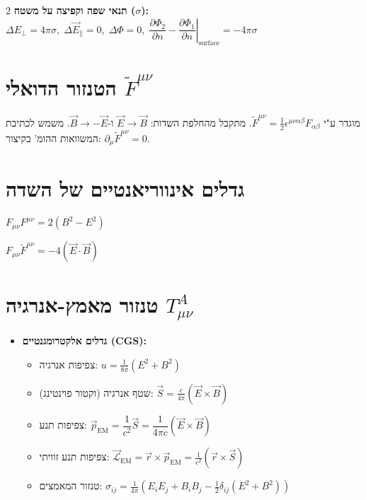\documentclass[10pt,a4paper]{article}
\begin{document}
\begin{multicols*}{2}
\textbf{תנאי שפה וקפיצה על משטח ($\sigma$):} 
\\
$\Delta E_\perp = 4\pi\sigma, \; \Delta \vec{E}_\parallel = 0, \; \Delta\Phi = 0, \; \left.\dfrac{\partial\Phi_2}{\partial n} - \dfrac{\partial\Phi_1}{\partial n}\right|_{\text{surface}} = -4\pi\sigma$

\section{הטנזור הדואלי $\tilde{F}^{\mu\nu}$}
מוגדר ע"י $\tilde{F}^{\mu\nu} = \frac{1}{2}\epsilon^{\mu\nu\alpha\beta}F_{\alpha\beta}$. מתקבל מהחלפת השדות: $\vec{E} \to \vec{B}$ ו-$\vec{B} \to -\vec{E}$.
משמש לכתיבת המשוואות ההומ' בקיצור: $\partial_\mu \tilde{F}^{\mu\nu} = 0$.

\section{גדלים אינווריאנטיים של השדה}
\begin{itemize*}[label=\textbullet, itemjoin={\quad}]
    \item $F_{\mu\nu}F^{\mu\nu} = 2(B^2 - E^2)$
    \item $F_{\mu\nu}\tilde{F}^{\mu\nu} = -4(\vec{E}\cdot\vec{B})$
\end{itemize*}

\section{טנזור מאמץ-אנרגיה $T_{\mu\nu}^{A}$}
\begin{itemize}
    \item \textbf{גדלים אלקטרומגנטיים \textenglish{(CGS)}:}
    \begin{itemize}
        \item צפיפות אנרגיה: $u = \frac{1}{8\pi}(E^2+B^2)$
        \item שטף אנרגיה (וקטור פוינטינג): $\vec{S} = \frac{c}{4\pi}(\vec{E}\times\vec{B})$
        \item צפיפות תנע: $\vec{p}_{\text{EM}} = \dfrac{1}{c^2}\vec{S} = \dfrac{1}{4\pi c}(\vec{E}\times\vec{B})$
        \item צפיפות תנע זוויתי: $\vec{\mathcal{L}}_{\text{EM}} = \vec{r} \times \vec{p}_{\text{EM}} = \frac{1}{c^2}(\vec{r} \times \vec{S})$
        \item טנזור המאמצים: $\sigma_{ij} = \frac{1}{4\pi}\left(E_i E_j + B_i B_j - \frac{1}{2}\delta_{ij}(E^2+B^2)\right)$
    \end{itemize}


\end{itemize}
\end{multicols*}
\end{document}
